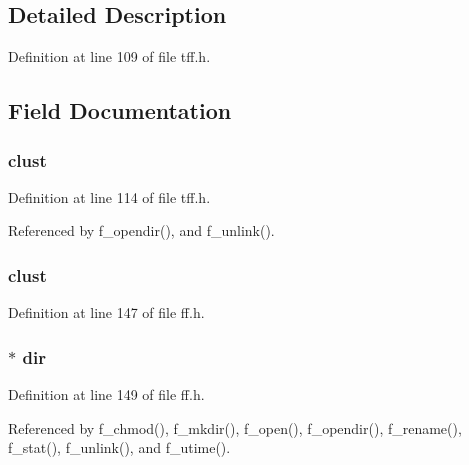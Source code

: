 \subsection{Detailed Description}


Definition at line 109 of file tff.\-h.



\subsection{Field Documentation}
\hypertarget{struct_d_i_r_aad779eab97ffc889755c8b483fbf9eb5}{
\subsubsection[{clust}]{ clust}}\label{struct_d_i_r_aad779eab97ffc889755c8b483fbf9eb5}


Definition at line 114 of file tff.\-h.



Referenced by f\-\_\-opendir(), and f\-\_\-unlink().

\hypertarget{struct_d_i_r_ac134c1b4645be670eb5207032e714616}{
\subsubsection[{clust}]{ clust}}\label{struct_d_i_r_ac134c1b4645be670eb5207032e714616}


Definition at line 147 of file ff.\-h.

\hypertarget{struct_d_i_r_ab9e26ba9262ce0f12d043d71dd4b2cf5}{
\subsubsection[{dir}]{$\ast$ dir}}\label{struct_d_i_r_ab9e26ba9262ce0f12d043d71dd4b2cf5}


Definition at line 149 of file ff.\-h.



Referenced by f\-\_\-chmod(), f\-\_\-mkdir(), f\-\_\-open(), f\-\_\-opendir(), f\-\_\-rename(), f\-\_\-stat(), f\-\_\-unlink(), and f\-\_\-utime().

